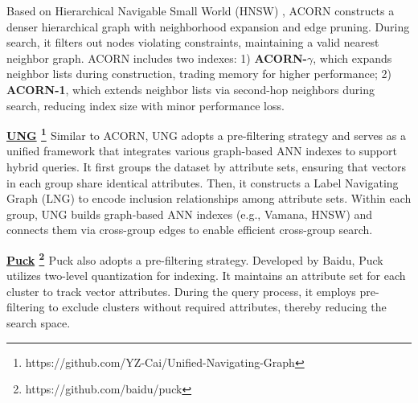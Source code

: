 \documentclass[sigconf, nonacm]{acmart}
\begin{document}
	Based on Hierarchical Navigable Small World (HNSW) \cite{hnsw}, ACORN constructs a denser hierarchical graph with neighborhood expansion and edge pruning. During search, it filters out nodes violating constraints, maintaining a valid nearest neighbor graph.
	ACORN includes two indexes: 1) \textbf{ACORN-$\gamma$}, which expands neighbor lists during construction, trading memory for higher performance; 
	2) \textbf{ACORN-1}, which extends neighbor lists via second-hop neighbors during search, reducing index size with minor performance loss.
	
	\noindent\textbf{\underline{UNG} \footnote{https://github.com/YZ-Cai/Unified-Navigating-Graph} \cite{UNG}} 
	Similar to ACORN, UNG adopts a pre-filtering strategy and serves as a unified framework that integrates various graph-based ANN indexes to support hybrid queries. It first groups the dataset by attribute sets, ensuring that vectors in each group share identical attributes. Then, it constructs a Label Navigating Graph (LNG) to encode inclusion relationships among attribute sets. Within each group, UNG builds graph-based ANN indexes (e.g., Vamana, HNSW) and connects them via cross-group edges to enable efficient cross-group search.
	
	
	
	\noindent\textbf{\underline{Puck} \footnote{https://github.com/baidu/puck} \cite{puck}} 
	Puck also adopts a pre-filtering strategy. Developed by Baidu, Puck utilizes two-level quantization for indexing. It maintains an attribute set for each cluster to track vector attributes. During the query process, it employs pre-filtering to exclude clusters without required attributes, thereby reducing the search space.
	
\end{document}
